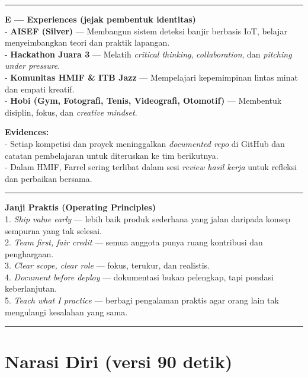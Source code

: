 \documentclass[
  letterpaper,
  DIV=11,
  numbers=noendperiod]{scrreprt}
\begin{document}
\begin{center}\rule{0.5\linewidth}{0.5pt}\end{center}

\textbf{E --- Experiences (jejak pembentuk identitas)}\\
- \textbf{AISEF (Silver)} --- Membangun sistem deteksi banjir berbasis
IoT, belajar menyeimbangkan teori dan praktik lapangan.\\
- \textbf{Hackathon Juara 3} --- Melatih \emph{critical thinking},
\emph{collaboration}, dan \emph{pitching under pressure}.\\
- \textbf{Komunitas HMIF \& ITB Jazz} --- Mempelajari kepemimpinan
lintas minat dan empati kreatif.\\
- \textbf{Hobi (Gym, Fotografi, Tenis, Videografi, Otomotif)} ---
Membentuk disiplin, fokus, dan \emph{creative mindset}.

\textbf{Evidences:}\\
- Setiap kompetisi dan proyek meninggalkan \emph{documented repo} di
GitHub dan catatan pembelajaran untuk diteruskan ke tim berikutnya.\\
- Dalam HMIF, Farrel sering terlibat dalam sesi \emph{review hasil
kerja} untuk refleksi dan perbaikan bersama.

\begin{center}\rule{0.5\linewidth}{0.5pt}\end{center}

\textbf{Janji Praktis (Operating Principles)}\\
1. \emph{Ship value early} --- lebih baik produk sederhana yang jalan
daripada konsep sempurna yang tak selesai.\\
2. \emph{Team first, fair credit} --- semua anggota punya ruang
kontribusi dan penghargaan.\\
3. \emph{Clear scope, clear role} --- fokus, terukur, dan realistis.\\
4. \emph{Document before deploy} --- dokumentasi bukan pelengkap, tapi
pondasi keberlanjutan.\\
5. \emph{Teach what I practice} --- berbagi pengalaman praktis agar
orang lain tak mengulangi kesalahan yang sama.

\begin{center}\rule{0.5\linewidth}{0.5pt}\end{center}

\section{Narasi Diri (versi 90 detik)}\label{narasi-diri-versi-90-detik}
\end{document}

